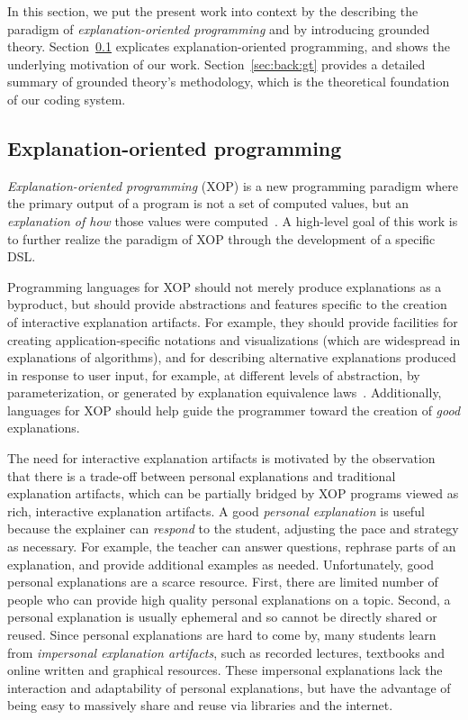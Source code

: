 \documentclass[sigconf]{acmart}
\begin{document}
 In this section, we
put the present work into context by the describing the paradigm of
\emph{explanation-oriented programming} and by introducing grounded theory.
Section~\ref{sec:back:xop} explicates explanation-oriented programming, and
shows the underlying motivation of our work. Section~\ref{sec:back:gt} provides
a detailed summary of grounded theory's methodology, which is the theoretical
foundation of our coding system.

\subsection{Explanation-oriented programming}
\label{sec:back:xop}

\emph{Explanation-oriented programming} (XOP) is a new programming paradigm
where the primary output of a program is not a set of computed values, but an
\emph{explanation of how} those values were
computed~\cite{EW08vl,EW09dsl,EW09vl,WE11dsl,EW13jvlc}.
%
A high-level goal of this work is to further realize the paradigm of XOP
through the development of a specific DSL.


Programming languages for XOP should not merely produce explanations as a
byproduct, but should provide abstractions and features specific to the
creation of interactive explanation artifacts. For example, they should provide
facilities for creating application-specific notations and visualizations
(which are widespread in explanations of algorithms), and for describing
alternative explanations produced in response to user input, for example, at
different levels of abstraction, by parameterization, or generated by
explanation equivalence laws~\cite{EW13jvlc}. Additionally, languages for XOP
should help guide the programmer toward the creation of \emph{good}
explanations.


The need for interactive explanation artifacts is motivated by the observation
that there is a trade-off between personal explanations and traditional
explanation artifacts, which can be partially bridged by XOP programs viewed as
rich, interactive explanation artifacts.
%
A good \emph{personal explanation} is useful because the explainer can
\emph{respond} to the student, adjusting the pace and strategy as necessary.
For example, the teacher can answer questions, rephrase parts of an
explanation, and provide additional examples as needed.
%
Unfortunately, good personal explanations are a scarce resource. First, there
are limited number of people who can provide high quality personal explanations
on a topic. Second, a personal explanation is usually ephemeral and so cannot
be directly shared or reused.
%
Since personal explanations are hard to come by, many students learn from
\emph{impersonal explanation artifacts}, such as recorded lectures, textbooks
and online written and graphical resources.
%
These impersonal explanations lack the interaction and adaptability of personal
explanations, but have the advantage of being easy to massively share and reuse
via libraries and the internet.
\end{document}
